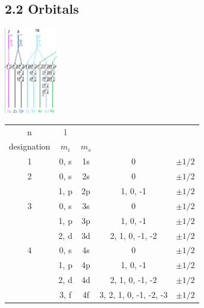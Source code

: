 \subsection{2.2 Orbitals}
  \begin{minipage}{0.99\linewidth}
    \begin{minipage}{0.32\linewidth}
      \includegraphics[width = 2.3cm]{src/2_Atoms/images/Energieniveau.png}
    \end{minipage}
    \begin{minipage}{0.49\linewidth}
      \begin{scriptsize}
        \begin{center}
            \begin{tabular}{|c|c|c|c|c|} 
                \hline
                n & l & \rotatebox{90}{\pbox{2cm}{subshell\\ designation}}    & $m_i$                  & $m_s$ \\ [0.5ex] 
                \hline\hline
                1 & 0, s & 1s                                  & 0                      & $\pm 1/2$ \\ 
                \hline
                2 & 0, s & 2s                                  & 0                      & $\pm 1/2$ \\
                  & 1, p & 2p                                  & 1, 0, -1               & $\pm 1/2$ \\
                \hline
                3 & 0, s & 3s                                  & 0                      & $\pm 1/2$ \\
                  & 1, p & 3p                                  & 1, 0, -1               & $\pm 1/2$ \\
                  & 2, d & 3d                                  & 2, 1, 0, -1, -2        & $\pm 1/2$ \\
                \hline
                4 & 0, s & 4s                                  & 0                      & $\pm 1/2$ \\
                  & 1, p & 4p                                  & 1, 0, -1               & $\pm 1/2$ \\
                  & 2, d & 4d                                  & 2, 1, 0, -1, -2        & $\pm 1/2$ \\
                  & 3, f & 4f                                  & 3, 2, 1, 0, -1, -2, -3 & $\pm 1/2$ \\
                \hline
            \end{tabular}
        \end{center}
        \end{scriptsize}
    \end{minipage}
  \end{minipage}
    
